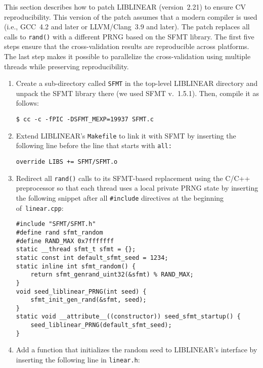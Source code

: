This section describes how to patch LIBLINEAR (version~2.21) to ensure CV
reproducibility. This version of the patch assumes that a modern compiler is
used (i.e., GCC~4.2 and later or LLVM/Clang~3.9 and later). The patch replaces
all calls to \texttt{rand()} with a different PRNG based on the SFMT
library\supercite{saito2008simd}. The first five steps ensure that the
cross-validation results are reproducible across platforms. The last step makes
it possible to parallelize the cross-validation using multiple threads while
preserving reproducibility.
\vspace*{-4.5mm}
\begin{enumerate}
\item Create a sub-directory called \verb|SFMT| in the top-level LIBLINEAR
  directory and unpack the SFMT library there (we used SFMT
  v.~1.5.1). Then, compile it as follows:
\vspace*{-5mm}
\begin{Verbatim}[fontsize=\small]
$ cc -c -fPIC -DSFMT_MEXP=19937 SFMT.c
\end{Verbatim}
\vspace*{-2mm}
\item Extend LIBLINEAR's \verb|Makefile| to link it with SFMT by inserting the
  following line before the line that starts with \verb|all:|
\begin{Verbatim}[fontsize=\small]
override LIBS += SFMT/SFMT.o
\end{Verbatim}
\item Redirect all \verb|rand()| calls to its SFMT-based replacement using
  the C/C++ preprocessor so that each thread uses a local private PRNG state by inserting the following snippet after all
  \verb|#include| directives at the beginning of~\verb|linear.cpp|:
\begin{Verbatim}[fontsize=\small]
#include "SFMT/SFMT.h"
#define rand sfmt_random
#define RAND_MAX 0x7fffffff
static __thread sfmt_t sfmt = {};
static const int default_sfmt_seed = 1234;
static inline int sfmt_random() {
    return sfmt_genrand_uint32(&sfmt) % RAND_MAX;
}
void seed_liblinear_PRNG(int seed) {
    sfmt_init_gen_rand(&sfmt, seed);
}
static void __attribute__((constructor)) seed_sfmt_startup() {
    seed_liblinear_PRNG(default_sfmt_seed);
}
\end{Verbatim}
\item Add a function that initializes the random seed to LIBLINEAR's interface by
  inserting the following line in \verb|linear.h|:
\begin{Verbatim}[fontsize=\small]

\end{Verbatim}
\end{enumerate}
